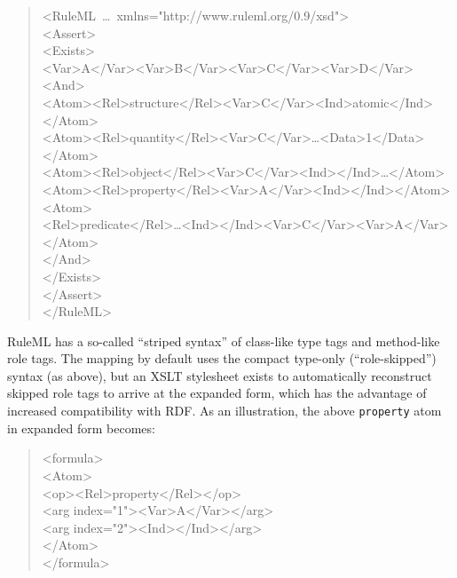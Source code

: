 \documentclass[12pt]{report}
\begin{document}
\begin{quote}
\small
\ttfamily
\setlength{\parindent}{0.1in}
<RuleML~\ldots~xmlns="http://www.ruleml.org/0.9/xsd">\\
\indent <Assert>\\
\indent \indent <Exists>\\
\indent \indent \indent <Var>A</Var><Var>B</Var><Var>C</Var><Var>D</Var>\\
\indent \indent \indent <And>\\
\indent \indent \indent \indent <Atom><Rel>structure</Rel><Var>C</Var><Ind>atomic</Ind></Atom>\\
\indent \indent \indent \indent <Atom><Rel>quantity</Rel><Var>C</Var>\ldots	<Data>1</Data></Atom>\\
\indent \indent \indent \indent <Atom><Rel>object</Rel><Var>C</Var><Ind></Ind>\ldots</Atom>\\
\indent \indent \indent \indent <Atom><Rel>property</Rel><Var>A</Var><Ind></Ind></Atom>\\
\indent \indent \indent \indent <Atom>\\
\indent \indent \indent \indent \indent <Rel>predicate</Rel>\ldots <Ind></Ind><Var>C</Var><Var>A</Var>\\
\indent \indent \indent \indent </Atom>\\
\indent \indent \indent </And>\\
\indent \indent </Exists>\\
\indent </Assert>\\
</RuleML>
\setlength{\parindent}{0.0in}
\normalfont
\end{quote}
RuleML has a so-called ``striped syntax'' of class-like type tags and method-like role tags. The mapping by default uses the compact type-only (``role-skipped'') syntax (as above), but an XSLT stylesheet exists to automatically reconstruct skipped role tags to arrive at the expanded form, which has the advantage of increased compatibility with RDF. As an illustration, the above \verb|property| atom in expanded form becomes:

\begin{quote}
\small
\ttfamily
\setlength{\parindent}{0.1in}
<formula>\\
\indent <Atom>\\
\indent \indent <op><Rel>property</Rel></op>\\
\indent \indent <arg index="1"><Var>A</Var></arg>\\
\indent \indent <arg index="2"><Ind></Ind></arg>\\
\indent </Atom>\\
</formula>
\setlength{\parindent}{0.0in}
\normalfont
\end{quote}
\end{document}

